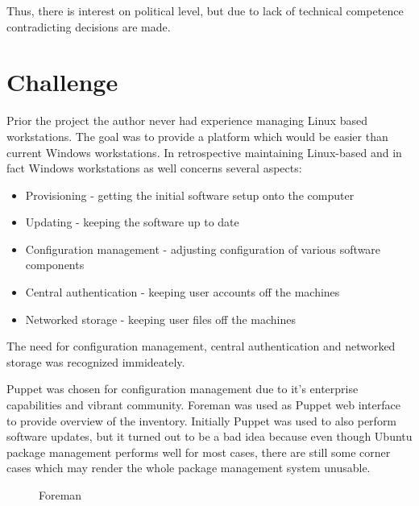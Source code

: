 \documentclass{article}
\begin{document}
Thus, there is interest on political level, but due to lack
of technical competence contradicting decisions are made.



\section{Challenge}

Prior the project the author never had experience managing Linux based workstations.
The goal was to provide a platform which would be easier than current Windows
workstations.
In retrospective maintaining Linux-based and in fact
Windows workstations as well concerns several aspects:

\begin{itemize}
\item Provisioning - getting the initial software setup onto the computer
\item Updating - keeping the software up to date
\item Configuration management - adjusting configuration of various software components
\item Central authentication - keeping user accounts off the machines
\item Networked storage - keeping user files off the machines
\end{itemize}

The need for configuration management, central authentication
and networked storage was recognized immideately.


Puppet was chosen for configuration management due to it's
enterprise capabilities and vibrant community.
Foreman was used as Puppet web interface to provide
overview of the inventory.
Initially Puppet was used to also perform software updates, but
it turned out to be a bad idea because even though Ubuntu package
management performs well for most cases, there are still some
corner cases which may render the whole package management
system unusable.

\begin{figure}[!htb]
\centering
{}
\caption{Foreman}
\label{fig:foreman}
\end{figure}
\end{document}
